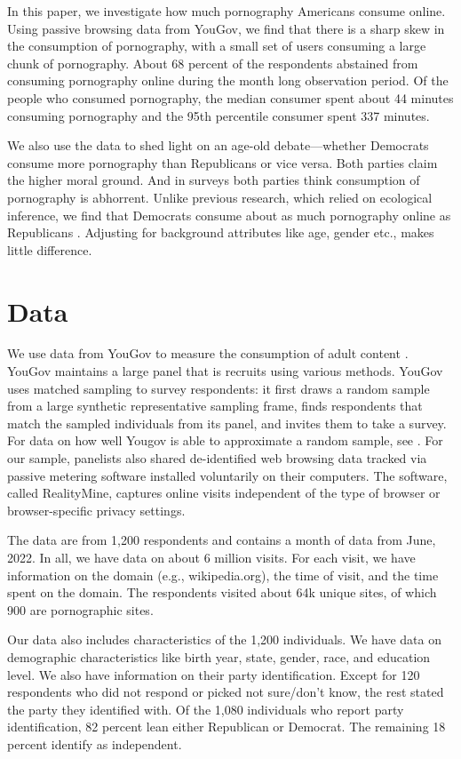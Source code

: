 \documentclass[12pt, letterpaper]{article}
\begin{document}
In this paper, we investigate how much pornography Americans consume online. Using passive browsing data from YouGov, we find that there is a sharp skew in the consumption of pornography, with a small set of users consuming a large chunk of pornography. About 68 percent of the respondents abstained from consuming pornography online during the month long observation period. Of the people who consumed pornography, the median consumer spent about 44 minutes consuming pornography and the 95th percentile consumer spent 337 minutes. 

We also use the data to shed light on an age-old debate---whether Democrats consume more pornography than Republicans or vice versa. Both parties claim the higher moral ground. And in surveys both parties think consumption of pornography is abhorrent. Unlike previous research, which relied on ecological inference, we find that Democrats consume about as much pornography online as Republicans \citep{macinnis2015american, edelman2009markets}. Adjusting for background attributes like age, gender etc., makes little difference.

\section*{Data}\label{sec:data}
We use data from YouGov to measure the consumption of adult content \citep{data-dataverse}. YouGov maintains a large panel that is recruits using various methods. YouGov uses matched sampling to survey respondents: it first draws a random sample from a large synthetic representative sampling frame, finds respondents that match the sampled individuals from its panel, and invites them to take a survey. For data on how well Yougov is able to approximate a random sample, see \citet{rivers2009}. For our sample, panelists also shared de-identified web browsing data tracked via passive metering software installed voluntarily on their computers. The software, called RealityMine, captures online visits independent of the type of browser or browser-specific privacy settings.

The data are from 1,200 respondents and contains a month of data from June, 2022. In all, we have data on about 6 million visits. For each visit, we have information on the domain (e.g., wikipedia.org), the time of visit, and the time spent on the domain. The respondents visited about 64k unique sites, of which 900 are pornographic sites. 

Our data also includes characteristics of the 1,200 individuals. We have data on demographic characteristics like birth year, state, gender, race, and education level. We also have information on their party identification. Except for 120 respondents  who did not respond or picked not sure/don't know, the rest stated the party they identified with.  Of the 1,080 individuals who report party identification, 82 percent lean either Republican or Democrat. The remaining 18 percent identify as independent. 
\end{document}
